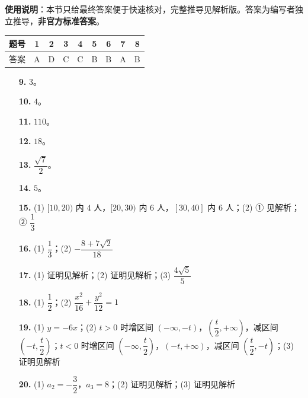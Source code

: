 
\begin{gknotice}
\textbf{使用说明}：本节只给最终答案便于快速核对，完整推导见解析版。答案为编写者独立推导，\textbf{非官方标准答案}。
\end{gknotice}

\begin{center}\begin{tabular}{ccccccccc}
\toprule
题号 & 1 & 2 & 3 & 4 & 5 & 6 & 7 & 8 \\
\midrule
答案 & A & D & C & C & B & B & A & B \\
\bottomrule
\end{tabular}\end{center}

\begin{itemize}[leftmargin=2.6em]
  \item[\textbf{9.}] $3$。
  \item[\textbf{10.}] $4$。
  \item[\textbf{11.}] $110$。
  \item[\textbf{12.}] $18$。
  \item[\textbf{13.}] $\dfrac{\sqrt7}2$。
  \item[\textbf{14.}] $5$。
\end{itemize}

\begin{itemize}[leftmargin=2.6em]
  \item[\textbf{15.}] (1) $[10,20)$ 内 $4$ 人，$[20,30)$ 内 $6$ 人，$[30,40]$ 内 $6$ 人；(2) ① 见解析；② $\dfrac13$
  \item[\textbf{16.}] (1) $\dfrac13$；(2) $-\dfrac{8+7\sqrt2}{18}$
  \item[\textbf{17.}] (1) 证明见解析；(2) 证明见解析；(3) $\dfrac{4\sqrt5}5$
  \item[\textbf{18.}] (1) $\dfrac12$；(2) $\dfrac{x^2}{16}+\dfrac{y^2}{12}=1$
  \item[\textbf{19.}] (1) $y=-6x$；(2) $t>0$ 时增区间 $(-\infty,-t)$，$\left(\dfrac t2,+\infty\right)$，减区间 $\left(-t,\dfrac t2\right)$；$t<0$ 时增区间 $\left(-\infty,\dfrac t2\right)$，$(-t,+\infty)$，减区间 $\left(\dfrac t2,-t\right)$；(3) 证明见解析
  \item[\textbf{20.}] (1) $a_2=-\dfrac32$，$a_3=8$；(2) 证明见解析；(3) 证明见解析
\end{itemize}
